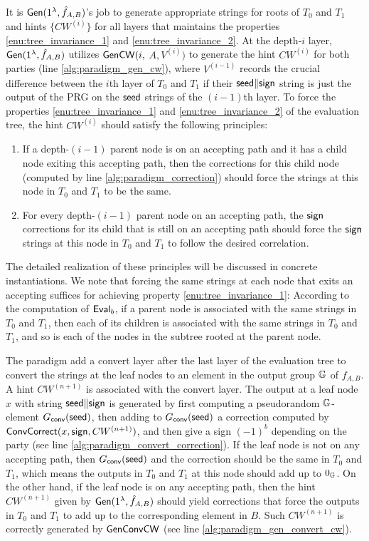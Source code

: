 It is ${\sf Gen}(1^\lambda, \hat{f}_{A,B})$'s job to generate appropriate strings for roots of $T_0$ and $T_1$ and hints $\{CW^{(i)}\}$ for all layers that maintains the properties \ref{enu:tree_invariance_1} and \ref{enu:tree_invariance_2}. At the depth-$i$ layer, ${\sf Gen}(1^\lambda, \hat{f}_{A,B})$ utilizes ${\sf GenCW}(i,$ $A, V^{(i)})$ to generate the hint $CW^{(i)}$ for both parties (line \ref{alg:paradigm_gen_cw}), where $V^{(i-1)}$ records the crucial difference between the $i$th layer of $T_0$ and $T_1$ if their ${\sf seed}\|{\sf sign}$ string is just the output of the PRG on the ${\sf seed}$ strings of the $(i-1)$th layer.  
To force the properties \ref{enu:tree_invariance_1} and \ref{enu:tree_invariance_2} of the evaluation tree, the hint $CW^{(i)}$ should satisfy the following principles: 
\begin{enumerate}
  \item If a depth-$(i-1)$ parent node is on an accepting path and it has a child node exiting this accepting path, then the corrections for this child node (computed by line \ref{alg:paradigm_correction}) should force the strings at this node in $T_0$ and $T_1$ to be the same. 
  \item For every depth-$(i-1)$ parent node on an accepting path, the ${\sf sign}$ corrections for its child that is still on an accepting path should force the ${\sf sign}$ strings at this node in $T_0$ and $T_1$ to follow the desired correlation. 
\end{enumerate}
The detailed realization of these principles will be discussed in concrete instantiations. We note that forcing the same strings at each node that exits an accepting suffices for achieving property \ref{enu:tree_invariance_1}: According to the computation of ${\sf Eval}_b$, if a parent node is associated with the same strings in $T_0$ and $T_1$, then each of its children is associated with the same strings in $T_0$ and $T_1$, and so is each of the nodes in the subtree rooted at the parent node. 

The paradigm add a convert layer after the last layer of the evaluation tree to convert the strings at the leaf nodes to an element in the output group $\mathbb{G}$ of $f_{A,B}$. A hint $CW^{(n+1)}$ is associated with the convert layer. The output at a leaf node $x$ with string ${\sf seed}\|{\sf sign}$ is generated by first computing a pseudorandom $\mathbb{G}$-element $G_{\sf conv}({\sf seed})$, then adding to $G_{\sf conv}({\sf seed})$ a correction computed by ${\sf ConvCorrect}(x, {\sf sign}, CW^{(n+1)})$, and then give a sign $(-1)^b$ depending on the party (see line \ref{alg:paradigm_convert_correction}). If the leaf node is not on any accepting path, then $G_{\sf conv}({\sf seed})$ and the correction should be the same in $T_0$ and $T_1$, which means the outputs in $T_0$ and $T_1$ at this node should add up to $0_{\mathbb{G}}$. On the other hand, if the leaf node is on any accepting path, then the hint $CW^{(n+1)}$ given by ${\sf Gen}(1^\lambda, \hat{f}_{A,B})$ should yield corrections that force the outputs in $T_0$ and $T_1$ to add up to the corresponding element in $B$. Such $CW^{(n+1)}$ is correctly generated by $\sf GenConvCW$ (see line \ref{alg:paradigm_gen_convert_cw}). 

